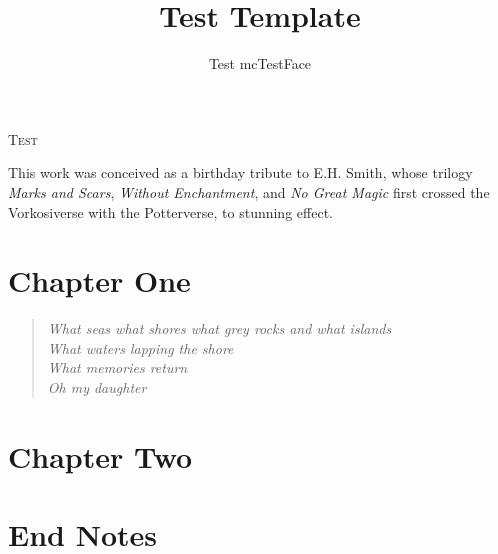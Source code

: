 \documentclass[letterpaper,showtrims,openright,onesided,12pt]{memoir}
\title{Test Template}
\author{Test mcTestFace}
\date{}
\begin{document}
\frontmatter

\begin{halftitle}
	\textsc{Test}

\end{halftitle}

\begin{frontispiece}
\end{frontispiece}

\begin{titlingpage}
	\setlength{\droptitle}{50pt}
	\maketitle{}
\end{titlingpage}

\begin{editionnotice}

\end{editionnotice}

\begin{dedication}
	This work was conceived as a birthday tribute to E.H. Smith, whose trilogy \emph{Marks and Scars}, \emph{Without Enchantment}, and \emph{No Great Magic} first crossed the Vorkosiverse with the Potterverse, to stunning effect.
\end{dedication}

\tableofcontents*

\mainmatter{}

\savepagenumber{}
\thispagestyle{empty}

%
\chapter{Chapter One}
\restorepagenumber{}
\vspace*{\droptitle}
\begin{verse}
	\emph{What seas what shores what grey rocks and what islands\\
		What waters lapping the shore\\
		What memories return\\
		Oh my daughter}
\end{verse}
\clearpage %
\blindtext{}
\chapter{Chapter Two}
\blinddocument{}
\backmatter{}
\chapter*{End Notes}
\blindtext{}
\end{document}
